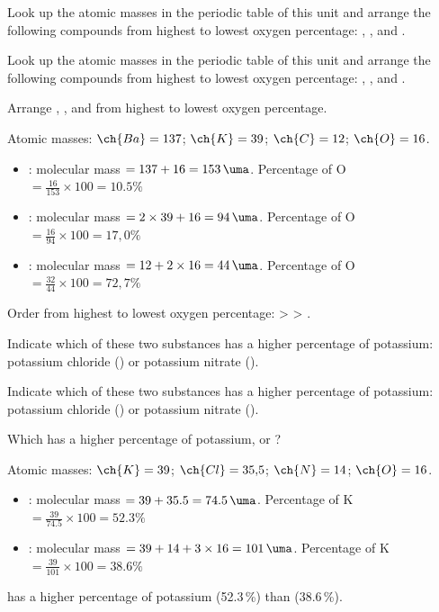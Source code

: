 \begin{exercise}
    Look up the atomic masses in the periodic table of this unit and arrange the following compounds from highest to lowest oxygen percentage: , , and .
    \begin{solu}
        Look up the atomic masses in the periodic table of this unit and arrange the following compounds from highest to lowest oxygen percentage: , , and .

        Arrange , , and  from highest to lowest oxygen percentage.

        Atomic masses: \( \ch{Ba} = 137 \); \( \ch{K} = 39 \); \( \ch{C} = 12 \); \( \ch{O} = 16 \).

        \begin{itemize}
            \item {}: molecular mass \( = 137 + 16 = \qty{153}{\uma} \). Percentage of O \( = \frac{16}{153} \times 100 = 10.5 \% \)
            \item {}: molecular mass \( = 2 \times 39 + 16 = \qty{94}{\uma} \). Percentage of O \( = \frac{16}{94} \times 100 = 17{,}0\% \)
            \item {}: molecular mass \( = 12 + 2 \times 16 = \qty{44}{\uma} \). Percentage of O \( = \frac{32}{44} \times 100 = 72{,}7\% \)
        \end{itemize}

        Order from highest to lowest oxygen percentage:  >  > .
    \end{solu}
\end{exercise}


\begin{exercise}
    Indicate which of these two substances has a higher percentage of potassium: potassium chloride () or potassium nitrate ().
    \begin{solu}
        Indicate which of these two substances has a higher percentage of potassium: potassium chloride () or potassium nitrate ().

        Which has a higher percentage of potassium,  or ?

        Atomic masses: \( \ch{K} = 39 \); \( \ch{Cl} = 35{,}5 \); \( \ch{N} = 14 \); \( \ch{O} = 16 \).

        \begin{itemize}
            \item {}: molecular mass \( = 39 + \num{35.5} = \qty{74.5}{\uma} \). Percentage of K \( = \frac{39}{74.5} \times 100 = 52.3\% \)
            \item {}: molecular mass \( = 39 + 14 + 3 \times 16 = \qty{101}{\uma} \). Percentage of K \( = \frac{39}{101} \times 100 = 38.6\% \)
        \end{itemize}

         has a higher percentage of potassium (52.3\,\%) than  (38.6\,\%).
    \end{solu}
\end{exercise}


